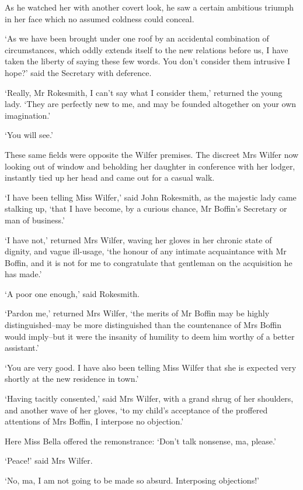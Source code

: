As he watched her with another covert look, he saw a certain ambitious
triumph in her face which no assumed coldness could conceal.

‘As we have been brought under one roof by an accidental combination of
circumstances, which oddly extends itself to the new relations before
us, I have taken the liberty of saying these few words. You don’t
consider them intrusive I hope?’ said the Secretary with deference.

‘Really, Mr Rokesmith, I can’t say what I consider them,’ returned the
young lady. ‘They are perfectly new to me, and may be founded altogether
on your own imagination.’

‘You will see.’

These same fields were opposite the Wilfer premises. The discreet
Mrs Wilfer now looking out of window and beholding her daughter in
conference with her lodger, instantly tied up her head and came out for
a casual walk.

‘I have been telling Miss Wilfer,’ said John Rokesmith, as the majestic
lady came stalking up, ‘that I have become, by a curious chance, Mr
Boffin’s Secretary or man of business.’

‘I have not,’ returned Mrs Wilfer, waving her gloves in her chronic
state of dignity, and vague ill-usage, ‘the honour of any intimate
acquaintance with Mr Boffin, and it is not for me to congratulate that
gentleman on the acquisition he has made.’

‘A poor one enough,’ said Rokesmith.

‘Pardon me,’ returned Mrs Wilfer, ‘the merits of Mr Boffin may be highly
distinguished--may be more distinguished than the countenance of Mrs
Boffin would imply--but it were the insanity of humility to deem him
worthy of a better assistant.’

‘You are very good. I have also been telling Miss Wilfer that she is
expected very shortly at the new residence in town.’

‘Having tacitly consented,’ said Mrs Wilfer, with a grand shrug of her
shoulders, and another wave of her gloves, ‘to my child’s acceptance of
the proffered attentions of Mrs Boffin, I interpose no objection.’

Here Miss Bella offered the remonstrance: ‘Don’t talk nonsense, ma,
please.’

‘Peace!’ said Mrs Wilfer.

‘No, ma, I am not going to be made so absurd. Interposing objections!’

